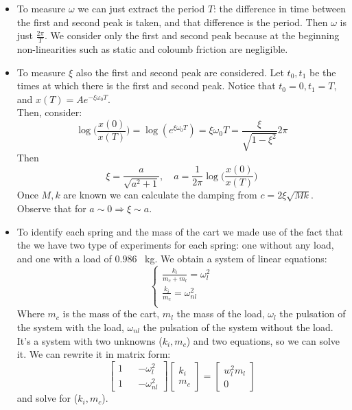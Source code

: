 \begin{itemize}

\item {To measure $\omega$ we can just extract the period $T$:  the difference in time between the first and second peak is taken, and that difference is the period. Then $\omega$ is just $\frac{2\pi}{T}$. We consider only the first and second peak because  at the beginning non-linearities such as static  and coloumb friction are negligible. }

\item {To measure $\xi$ also the first and second peak are considered. Let $t_0, t_1$ be the times at which there is the first and second peak. Notice that $t_0=0, t_1=T$, and $x(T)= Ae^{-\xi \omega_0 T}$.\\
Then, consider:
$$\log \Big(\frac{x(0)}{x(T)}\Big) =  \log(e^{\xi \omega_0 T}) = \xi \omega_0 T = \frac{\xi}{\sqrt{1-\xi^2}} 2\pi$$
Then $$\xi = \frac{a}{\sqrt{a^2+1}}, \quad a = \frac{1}{2\pi}\log \Big(\frac{x(0)}{x(T)}\Big)$$
Once $M,k$ are known we can calculate the damping from $c= 2\xi \sqrt{Mk}$. Observe that for $a \sim 0 \Rightarrow \xi \sim a$.
}

\item {To identify each spring and the mass of the cart we made use of the fact that the we have two type of experiments for each spring: one without any load, and one with a load of  $0.986$ \SI{}{\kilo\gram}. We obtain a system of linear equations:
$$
\begin{cases}
\frac{k_i}{m_c+m_l} = \omega_l^2 \\
\frac{k_i}{m_c} = \omega_{nl}^2 \\
\end{cases}
$$
Where $m_c$ is the mass of the cart, $m_l$ the mass of the load, $\omega_l$ the pulsation of the system with the load, $\omega_{nl}$ the pulsation of the system without the load. It's a system with two unknowns ($k_i, m_c$) and two equations, so we can solve it. We can rewrite it in matrix form:
$$\begin{bmatrix}
1  && - \omega_l^2 \\
1 && -\omega_{nl}^2
\end{bmatrix}  
\begin{bmatrix}
k_i \\ m_c
\end{bmatrix}  
=\begin{bmatrix}
w_l^2 m_l \\
0
\end{bmatrix}  
$$
and solve for ($k_i, m_c$).
}


\end{itemize}
